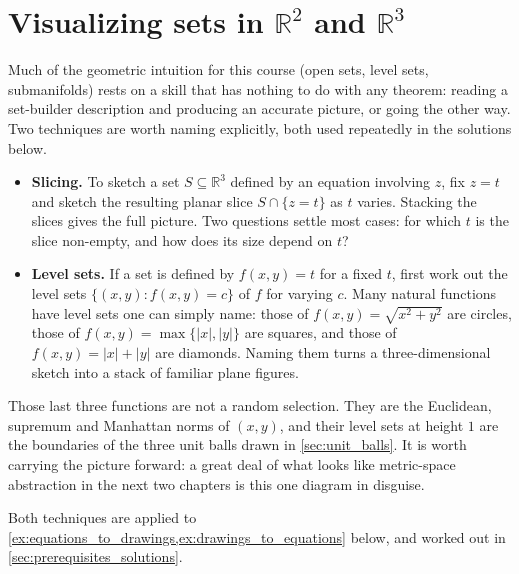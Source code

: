 \section{Visualizing sets in \texorpdfstring{$\mathbb{R}^2$}{R2} and \texorpdfstring{$\mathbb{R}^3$}{R3}}
\label{sec:visualizing_sets}

Much of the geometric intuition for this course (open sets, level sets, submanifolds) rests on a
skill that has nothing to do with any theorem: reading a set-builder description and producing an
accurate picture, or going the other way. Two techniques are worth naming explicitly, both used
repeatedly in the solutions below.

\begin{itemize}
  \item \textbf{Slicing.} To sketch a set $S \subseteq \mathbb{R}^3$ defined by an equation
    involving $z$, fix $z = t$ and sketch the resulting planar slice $S \cap \{z = t\}$ as $t$
    varies. Stacking the slices gives the full picture. Two questions settle most cases: for which
    $t$ is the slice non-empty, and how does its size depend on $t$?
  \item \textbf{Level sets.} If a set is defined by $f(x,y) = t$ for a fixed $t$, first work out
    the level sets $\{(x,y) : f(x,y) = c\}$ of $f$ for varying $c$. Many natural functions have
    level sets one can simply name: those of $f(x,y) = \sqrt{x^2+y^2}$ are circles, those of
    $f(x,y) = \max\{|x|,|y|\}$ are squares, and those of $f(x,y) = |x|+|y|$ are diamonds. Naming
    them turns a three-dimensional sketch into a stack of familiar plane figures.
\end{itemize}

Those last three functions are not a random selection. They are the Euclidean, supremum and
Manhattan norms of $(x,y)$, and their level sets at height $1$ are the boundaries of the three
unit balls drawn in \cref{sec:unit_balls}. It is worth carrying the picture forward: a great deal of what looks like
metric-space abstraction in the next two chapters is this one diagram in disguise.

Both techniques are applied to \cref{ex:equations_to_drawings,ex:drawings_to_equations} below, and worked out in
\cref{sec:prerequisites_solutions}.

